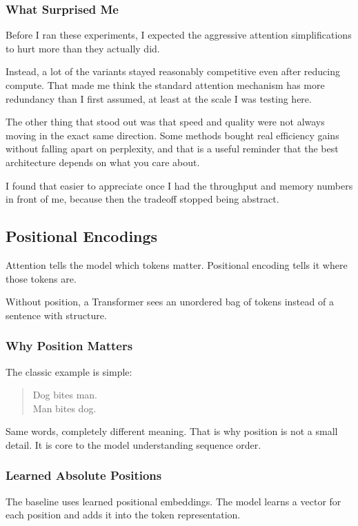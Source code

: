 \documentclass[11pt]{article}
\begin{document}
\subsubsection{What Surprised Me}
Before I ran these experiments, I expected the aggressive attention simplifications to hurt more than they actually did.

Instead, a lot of the variants stayed reasonably competitive even after reducing compute. That made me think the standard attention mechanism has more redundancy than I first assumed, at least at the scale I was testing here.

The other thing that stood out was that speed and quality were not always moving in the exact same direction. Some methods bought real efficiency gains without falling apart on perplexity, and that is a useful reminder that the best architecture depends on what you care about.

I found that easier to appreciate once I had the throughput and memory numbers in front of me, because then the tradeoff stopped being abstract.

\subsection{Positional Encodings}
Attention tells the model which tokens matter. Positional encoding tells it where those tokens are.

Without position, a Transformer sees an unordered bag of tokens instead of a sentence with structure.

\subsubsection{Why Position Matters}
The classic example is simple:
\begin{quote}
Dog bites man.\\
Man bites dog.
\end{quote}

Same words, completely different meaning. That is why position is not a small detail. It is core to the model understanding sequence order.

\subsubsection{Learned Absolute Positions}
The baseline uses learned positional embeddings. The model learns a vector for each position and adds it into the token representation.
\end{document}
